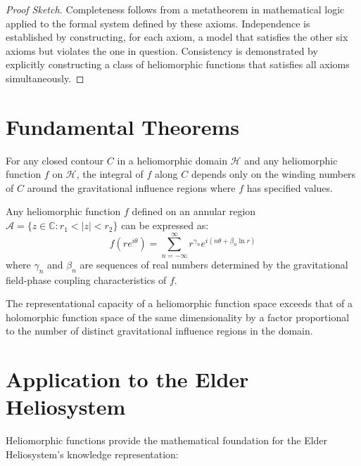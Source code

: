 \begin{proof}[Proof Sketch]
Completeness follows from a metatheorem in mathematical logic applied to the formal system defined by these axioms. Independence is established by constructing, for each axiom, a model that satisfies the other six axioms but violates the one in question. Consistency is demonstrated by explicitly constructing a class of heliomorphic functions that satisfies all axioms simultaneously.
\end{proof}

\section{Fundamental Theorems}

\begin{theorem}
For any closed contour $C$ in a heliomorphic domain $\mathcal{H}$ and any heliomorphic function $f$ on $\mathcal{H}$, the integral of $f$ along $C$ depends only on the winding numbers of $C$ around the gravitational influence regions where $f$ has specified values.
\end{theorem}

\begin{theorem}
Any heliomorphic function $f$ defined on an annular region $\mathcal{A} = \{z \in \mathbb{C} : r_1 < |z| < r_2\}$ can be expressed as:
\begin{equation}
f(re^{i\theta}) = \sum_{n=-\infty}^{\infty} r^{\gamma_n} e^{i(n\theta + \beta_n \ln r)}
\end{equation}
where $\gamma_n$ and $\beta_n$ are sequences of real numbers determined by the gravitational field-phase coupling characteristics of $f$.
\end{theorem}

\begin{theorem}
The representational capacity of a heliomorphic function space exceeds that of a holomorphic function space of the same dimensionality by a factor proportional to the number of distinct gravitational influence regions in the domain.
\end{theorem}

\section{Application to the Elder Heliosystem}

Heliomorphic functions provide the mathematical foundation for the Elder Heliosystem's knowledge representation:

